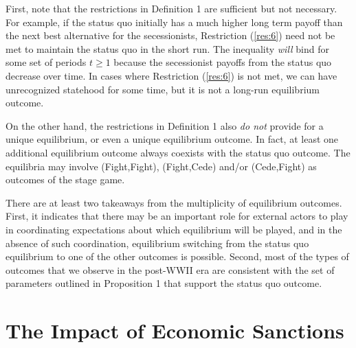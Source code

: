 First, note that the restrictions in Definition 1 are sufficient but not necessary. For example, if the status quo initially has a much higher long term payoff than the next best alternative for the secessionists, Restriction (\ref{res:6}) need not be met to maintain the status quo in the short run. The inequality \emph{will} bind for some set of periods $t \geq 1$ because the secessionist payoffs from the status quo decrease over time. In cases where Restriction (\ref{res:6}) is not met, we can have unrecognized statehood for some time, but it is not a long-run equilibrium outcome.

On the other hand, the restrictions in Definition 1 also \emph{do not} provide for a unique equilibrium, or even a unique equilibrium outcome. In fact, at least one additional equilibrium outcome always coexists with the status quo outcome. The equilibria may involve (Fight,Fight), (Fight,Cede) and/or (Cede,Fight) as outcomes of the stage game.

There are at least two takeaways from the multiplicity of equilibrium outcomes. First, it indicates that there may be an important role for external actors to play in coordinating expectations about which equilibrium will be played, and in the absence of such coordination, equilibrium switching from the status quo equilibrium to one of the other outcomes is possible. Second, most of the types of outcomes that we observe in the post-WWII era are consistent with the set of parameters outlined in Proposition 1 that support the status quo outcome. 

\section{The Impact of Economic Sanctions}
\label{sec:sanctions}


